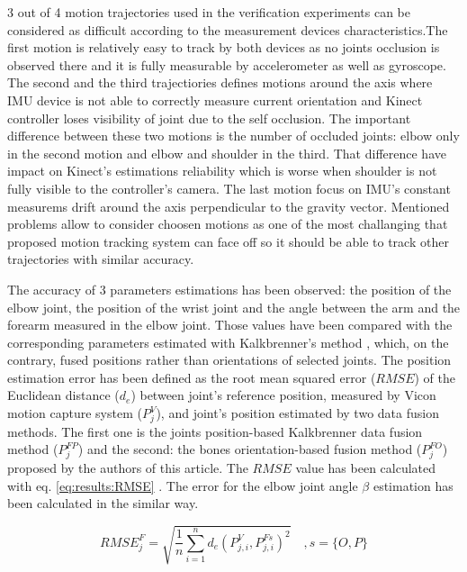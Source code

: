 \documentclass[sensors,article,submit,moreauthors,pdftex,10pt,a4paper]{mdpi}
\begin{document}
3 out of 4 motion trajectories used in the verification experiments can be considered as difficult according to the measurement devices characteristics.The first motion is relatively easy to track by both devices as no joints occlusion is observed there and it is fully measurable by accelerometer as well as gyroscope. The second and the third trajectiories defines motions around the axis where IMU device is not able to correctly measure current orientation and Kinect controller loses visibility of joint due to the self occlusion. The important difference between these two motions is the number of occluded joints: elbow only in the second motion and elbow and shoulder in the third. That difference have impact on Kinect's estimations reliability which is worse when shoulder is not fully visible to the controller's camera. The last motion focus on IMU's constant measurems drift around the axis perpendicular to the gravity vector. Mentioned problems allow to consider choosen motions as one of the most challanging that proposed motion tracking system can face off so it should be able to track other trajectories with similar accuracy.
		
The accuracy of 3 parameters estimations has been observed: the position of the elbow joint, the position of the wrist joint and the angle between the arm and the forearm measured in the elbow joint. Those values have been compared with the corresponding parameters estimated with Kalkbrenner’s method \cite{Kalkbrenner2014}, which, on the contrary, fused positions rather than orientations of selected joints. The position estimation error has been defined as the root mean squared error ($RMSE$) of the Euclidean distance ($d_e$) between joint’s reference position, measured by Vicon motion capture system ($P_j^V$), and joint’s position estimated by two data fusion methods. The first one is the joints position-based Kalkbrenner data fusion method ($P_j^{FP}$) and the second: the bones orientation-based fusion method ($P_j^{FO}$) proposed by the authors of this article. The $RMSE$ value has been calculated with eq. \ref{eq:results:RMSE} \cite{Armstrong1992}. The error for the elbow joint angle $\beta$ estimation has been calculated in the similar way.
		
\begin{equation}
	{RMSE}^F_j = \sqrt{\frac{1}{n}\sum_{i=1}^{n}{d_e(P^V_{j,i}, P^{Fs}_{j,i})^2}}\quad , s = \{O,P\}
	\label{eq:results:RMSE}
\end{equation}
		
\end{document}
